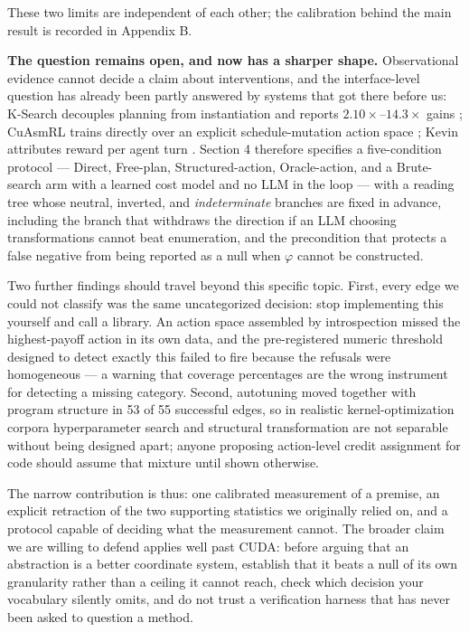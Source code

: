 \documentclass[
  11pt,
]{article}
\begin{document}
These two limits are independent of each other; the calibration behind the main result is recorded in Appendix B.

\textbf{The question remains open, and now has a sharper shape.} Observational evidence cannot decide a claim about interventions, and the interface-level question has already been partly answered by systems that got there before us: K-Search decouples planning from instantiation and reports \(2.10\times\)--\(14.3\times\) gains \cite{ksearch29}; CuAsmRL trains directly over an explicit schedule-mutation action space \cite{cuasmrl30}; Kevin attributes reward per agent turn \cite{kevin32}. Section 4 therefore specifies a five-condition protocol --- Direct, Free-plan, Structured-action, Oracle-action, and a Brute-search arm with a learned cost model and no LLM in the loop --- with a reading tree whose neutral, inverted, and \emph{indeterminate} branches are fixed in advance, including the branch that withdraws the direction if an LLM choosing transformations cannot beat enumeration, and the precondition that protects a false negative from being reported as a null when \(\varphi\) cannot be constructed.

Two further findings should travel beyond this specific topic. First, every edge we could not classify was the same uncategorized decision: stop implementing this yourself and call a library. An action space assembled by introspection missed the highest-payoff action in its own data, and the pre-registered numeric threshold designed to detect exactly this failed to fire because the refusals were homogeneous --- a warning that coverage percentages are the wrong instrument for detecting a missing category. Second, autotuning moved together with program structure in 53 of 55 successful edges, so in realistic kernel-optimization corpora hyperparameter search and structural transformation are not separable without being designed apart; anyone proposing action-level credit assignment for code should assume that mixture until shown otherwise.

The narrow contribution is thus: one calibrated measurement of a premise, an explicit retraction of the two supporting statistics we originally relied on, and a protocol capable of deciding what the measurement cannot. The broader claim we are willing to defend applies well past CUDA: before arguing that an abstraction is a better coordinate system, establish that it beats a null of its own granularity rather than a ceiling it cannot reach, check which decision your vocabulary silently omits, and do not trust a verification harness that has never been asked to question a method.
\end{document}
